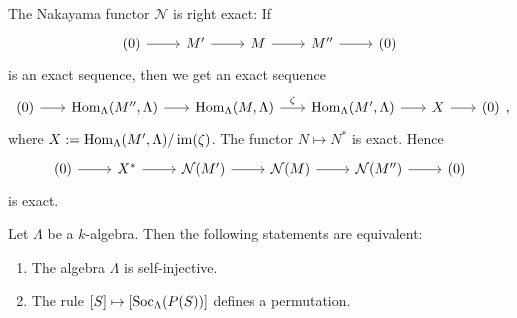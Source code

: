 %




\begin{remark}
The Nakayama functor $\mathcal N$ is right exact: If
\[
\begin{tikzcd}
	(0) \ar[r] & M' \ar[r] & M \ar[r] & M'' \ar[r] & (0)
\end{tikzcd}
\]
is an exact sequence, then we get an exact sequence
\[
\begin{tikzcd}[column sep = scriptsize]
(0) \ar[r] & \Hom_\Lambda(M'',\Lambda) \ar[r] & \Hom_\Lambda(M,\Lambda) \ar[r,"\zeta"] & \Hom_\Lambda(M',\Lambda) \ar[r] & X \ar[r] & (0)
\end{tikzcd},
\]
where $X:=\operatorname{Hom}_\Lambda(M',\Lambda)/\operatorname{im}(\zeta)$. The functor $N\mapsto N^*$ is exact. Hence
\[
\begin{tikzcd}
	(0) \ar[r] & X^* \ar[r] & \mathcal N(M') \ar[r] & \mathcal N(M) \ar[r] & \mathcal N(M'') \ar[r] & (0)
\end{tikzcd}
\]
is exact.
\end{remark}


\begin{theorem}\label{1.5.5}
Let $\Lambda$ be a $k$-algebra. Then the following statements are equivalent:
\begin{enumerate}
\item The algebra $\Lambda$ is self-injective.
\item The rule $[S]\mapsto [\operatorname{Soc}_\Lambda(P(S))]$ defines a permutation.
\end{enumerate}
\end{theorem}


